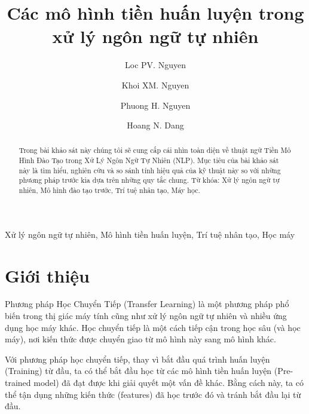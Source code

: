 \documentclass[10pt]{elsarticle}
\begin{document}
\begin{frontmatter}

\title{Các mô hình tiền huấn luyện trong xử lý ngôn ngữ tự nhiên}

\author{Loc PV. Nguyen}

\author{Khoi XM. Nguyen}

\author{Phuong H. Nguyen}

\author{Hoang N. Dang}


\address{Faculty of Information Technology, FPT University Global Education, Ho Chi Minh city, Vietnam}



\begin{abstract}
Trong bài khảo sát này chúng tôi sẽ cung cấp cái nhìn toàn diện về thuật ngữ Tiền Mô Hình Đào Tạo trong Xử Lý Ngôn Ngữ Tự Nhiên (NLP). Mục tiêu của bài khảo sát này là tìm hiểu, nghiên cứu và so sánh tính hiệu quả của kỹ thuật này so với những phương pháp trước kia dựa trên những quy tắc chung.
Từ khóa: Xử lý ngôn ngữ tự nhiên, Mô hình đào tạo trước, Trí tuệ nhân tạo, Máy học.  
\end{abstract}

\begin{keyword}
Xử lý ngôn ngữ tự nhiên, Mô hình tiền huấn luyện, Trí tuệ nhân tạo, Học máy
\end{keyword}

\end{frontmatter}

\linenumbers

\section{Giới thiệu}
Phương pháp Học Chuyển Tiếp (Transfer Learning) là một phương pháp phổ biến trong thị giác máy tính cũng như xử lý ngôn ngữ tự nhiên và nhiều ứng dụng học máy khác. Học chuyển tiếp là một cách tiếp cận trong học sâu (và học máy), nơi kiến thức được chuyển giao từ mô hình này sang mô hình khác.

Với phương pháp học chuyển tiếp, thay vì bắt đầu quá trình huấn luyện (Training) từ đầu, ta có thể bắt đầu học từ các mô hình tiền huấn luyện (Pre-trained model) đã đạt được khi giải quyết một vấn đề khác. Bằng cách này, ta có thể tận dụng những kiến thức (features) đã học trước đó và tránh bắt đầu lại từ đầu.
\end{document}
